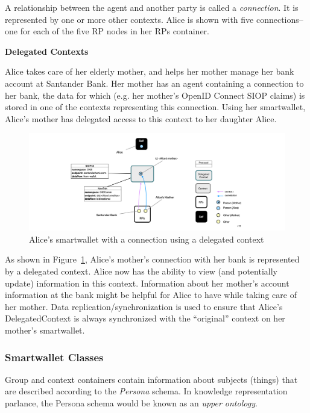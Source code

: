 \documentclass[11pt, oneside]{article}   	%
\begin{document}
A relationship between the agent and another party is called a \emph{connection}. It is represented by one or more other contexts. Alice is shown with five connections--one for each of the five RP nodes in her RPs container. 

\textbf{Delegated Contexts}

Alice takes care of her elderly mother, and helps her mother manage her bank account at Santander Bank. Her mother has an agent containing a connection to her bank, the data for which (e.g. her mother's OpenID Connect SIOP claims) is stored in one of the contexts representing this connection. Using her smartwallet, Alice's mother has delegated access to this context to her daughter Alice.

\begin{figure}[htbp]
\includegraphics[width=\textwidth]{./images/delegated-contexts.png}
\caption{Alice's smartwallet with a connection using a delegated context}
\label{fig:delegated-contexts}
\end{figure}

As shown in Figure~\ref{fig:delegated-contexts}, Alice's mother's connection with her bank is represented by a delegated context. Alice now has the ability to view (and potentially update) information in this context. Information about her mother's account information at the bank might be helpful for Alice to have while taking care of her mother. Data replication/synchronization is used to ensure that Alice's DelegatedContext is always synchronized with the ``original'' context on her mother's smartwallet.

\subsubsection{Smartwallet Classes}

Group and context containers contain information about subjects (things) that are described according to the \emph{Persona} schema. In knowledge representation parlance, the Persona schema would be known as an \emph{upper ontology}.
\end{document}
